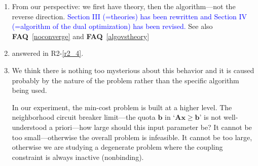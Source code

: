 \documentclass[11pt]{article}
\newcommand{\faq}[1]{\textbf{FAQ}~\ref{#1}}
\newcommand{\blue}[1]{\textcolor{blue}{#1}}
\begin{document}
\begin{enumerate}
    (cf. R4-\ref{multihouseblock}.) (\blue{A footnote was added in the manuscript about this point.})
    Therefore we only implemented the social contact in the form of EV lending between two households.
    \par
    The social links, specifically the EV lending possibility, exist in each block with a pair of households.
    And we made sure that the flow direction of lending power goes from household 1 (with RES) to household 2 (without RES), which is quite intuitive.
    So it can be perceived as empirical-based (the algorithm theories of this paper did't pertain too much here).
    \par
    The EV charging dynamics are modeled in MILP form.
    Actually, the original (no EV lending) model is a special case derived from the current (allow EV lending) model
    by adding the restriction $b^\mathrm{Lent} \equiv 1$.
    So from the mathematical sense we are doing a proper extension.
    In physical terms, the load of household 2 might be alleviated since EV2 can also be charged
    in household 1.
    In optimization terms, at certain $t$'s, the constraint about the EV2's circuit breaker's limit
    might be less likely to be binding (than the original no EV lending setting).
    \par
    To sum up, (i) it's a standard MILP model so it is self-explanatory just like the other devices,
    (ii) this happens locally inside a block while this paper lean more weight on coordinator-customer interaction.
    (Related to R5-\ref{r5_7})
    \item \label{r5_4} From our perspective: we first have theory, then the algorithm---not the reverse direction. \blue{Section III (=theories) has been rewritten and Section IV (=algorithm of the dual optimization) has been revised.} See also \faq{noconverge} and \faq{algovstheory}
    \item answered in R2-\ref{r2_4}.
    \item \label{r5_6} We think there is nothing too mysterious about this behavior and it is caused probably by the nature of the problem
    rather than the specific algorithm being used.
    \par
    In our experiment, the min-cost problem is built at a higher level.
    The neighborhood circuit breaker limit---the quota $\mathbf{b}$ in `$\mathbf{A}\mathbf{x} \ge \mathbf{b}$'
    is not well-understood a priori---how large should this input parameter be?
    It cannot be too small---otherwise the overall problem is infeasible.
    It cannot be too large, otherwise we are studying a degenerate problem where the coupling constraint is always inactive (nonbinding).

\end{enumerate}
\end{document}
